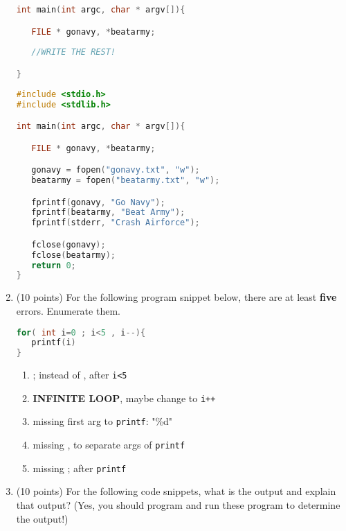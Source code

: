\documentclass{article}[9pt]
\newenvironment{answerfont}{\fontfamily{qhv}\selectfont}{\par}
\newenvironment{myanswer}{\begin{mdframed}\begin{answerfont}}{\end{answerfont}\end{mdframed}}
\begin{document}
\begin{enumerate}
\begin{lstlisting}[language=c]
int main(int argc, char * argv[]){

   FILE * gonavy, *beatarmy;
   
   //WRITE THE REST!

}
\end{lstlisting}

\begin{myanswer}
\begin{lstlisting}[language=c]
#include <stdio.h>
#include <stdlib.h>

int main(int argc, char * argv[]){

   FILE * gonavy, *beatarmy;

   gonavy = fopen("gonavy.txt", "w");
   beatarmy = fopen("beatarmy.txt", "w");

   fprintf(gonavy, "Go Navy");
   fprintf(beatarmy, "Beat Army");
   fprintf(stderr, "Crash Airforce");

   fclose(gonavy);
   fclose(beatarmy);
   return 0;
}
\end{lstlisting}

\end{myanswer}

\item (10 points) For the following program snippet below, there are at least
\textbf{five} errors. Enumerate them.

\begin{lstlisting}[language=c]
for( int i=0 ; i<5 , i--){
   printf(i)
}
\end{lstlisting}

\begin{myanswer}
\begin{enumerate}
  \item ; instead of , after \texttt{i<5}

  \item \textbf{INFINITE LOOP}, maybe change to \texttt{i++}

  \item missing first arg to \texttt{printf}: "\%d"

  \item missing , to separate args of \texttt{printf}

  \item missing ; after \texttt{printf}
\end{enumerate}
\end{myanswer}

\item (10 points) For the following code snippets, what is the output and explain
that output? (Yes, you should program and run these program to
determine the output!)


\end{enumerate}
\end{document}

